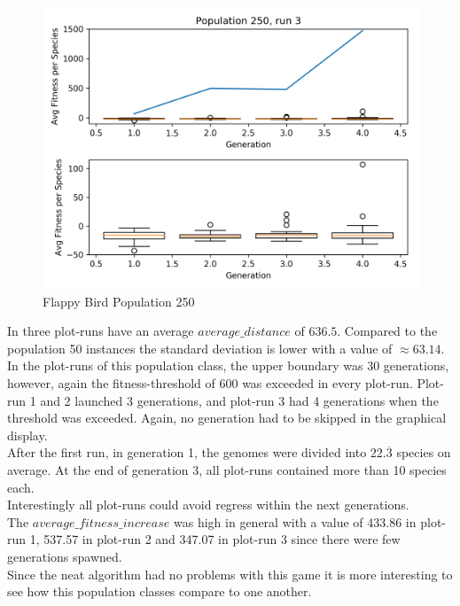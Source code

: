 \begin{figure}[h]
				\begin{minipage}{0.33\textwidth}
					\centering
					\includegraphics[width=1\textwidth]{graphics/flappy/pop250_run3} %
				\end{minipage}
				\caption{Flappy Bird Population 250}
				\label{fig:flappy250}
			\end{figure}
			In three plot-runs have an average $average\_distance$ of $636.5$. Compared to the population 50 instances the standard deviation is lower with a value of $\approx63.14$. 
			In the plot-runs of this population class, the upper boundary was $30$ generations, however, again the fitness-threshold of 600 was exceeded in every plot-run. Plot-run 1 and 2 launched 3 generations, and plot-run 3 had 4 generations when the threshold was exceeded. Again, no generation had to be skipped in the graphical display.\\
			After the first run, in generation 1, the genomes were divided into $22.\overline{3}$ species on average. At the end of generation 3, all plot-runs contained more than 10 species each.\\
			Interestingly all plot-runs could avoid regress within the next generations. \\
			The $average\_fitness\_increase$ was high in general with a value of 433.86 in plot-run 1, 537.57 in plot-run 2 and 347.07 in plot-run 3 since there were few generations spawned.\\
			Since the \gls{neat} algorithm had no problems with this game it is more interesting to see how this population classes compare to one another.
		
